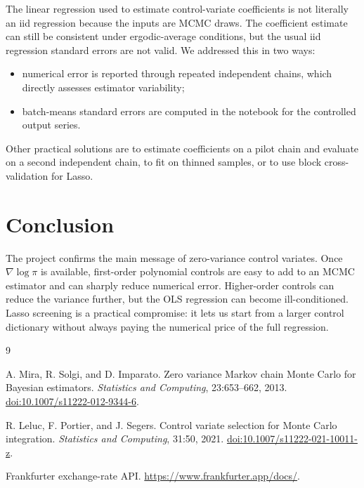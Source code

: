 \documentclass[11pt]{article}
\newcommand{\doi}[1]{\href{https://doi.org/#1}{doi:#1}}
\begin{document}
The linear regression used to estimate control-variate coefficients is not literally an iid regression because the inputs are MCMC draws.  The coefficient estimate can still be consistent under ergodic-average conditions, but the usual iid regression standard errors are not valid.  We addressed this in two ways:
\begin{itemize}
  \item numerical error is reported through repeated independent chains, which directly assesses estimator variability;
  \item batch-means standard errors are computed in the notebook for the controlled output series.
\end{itemize}
Other practical solutions are to estimate coefficients on a pilot chain and evaluate on a second independent chain, to fit on thinned samples, or to use block cross-validation for Lasso.

\begin{table}[H]
  \centering
  \small
  
  \caption{A small thinning check on the simulated representative chain.  Thinning changes little here, suggesting that the regression fit is not dominated by adjacent highly dependent draws.}
\end{table}

\section{Conclusion}

The project confirms the main message of zero-variance control variates.  Once \(\nabla\log\pi\) is available, first-order polynomial controls are easy to add to an MCMC estimator and can sharply reduce numerical error.  Higher-order controls can reduce the variance further, but the OLS regression can become ill-conditioned.  Lasso screening is a practical compromise: it lets us start from a larger control dictionary without always paying the numerical price of the full regression.

\begin{thebibliography}{9}

A. Mira, R. Solgi, and D. Imparato.
\newblock Zero variance Markov chain Monte Carlo for Bayesian estimators.
\newblock \emph{Statistics and Computing}, 23:653--662, 2013.
\newblock \doi{10.1007/s11222-012-9344-6}.

R. Leluc, F. Portier, and J. Segers.
\newblock Control variate selection for Monte Carlo integration.
\newblock \emph{Statistics and Computing}, 31:50, 2021.
\newblock \doi{10.1007/s11222-021-10011-z}.

Frankfurter exchange-rate API.
\newblock \url{https://www.frankfurter.app/docs/}.

\end{thebibliography}
\end{document}
